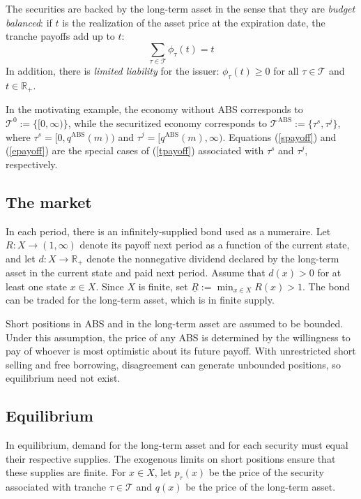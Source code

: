 \documentclass[11pt]{article}
\theoremstyle{plain}
\begin{document}
The securities are backed by the long-term asset in the sense that they are \textit{budget balanced}: if $t$ is the realization of the asset price at the expiration date, the tranche payoffs add up to $t$:
\begin{equation*}
\sum_{\tau\in\mathcal{T}} \phi_\tau(t)=t
\end{equation*}
In addition, there is \textit{limited liability} for the issuer: $\phi_\tau(t) \geq 0$ for all $\tau\in\mathcal{T}$ and $t\in\mathbb{R}_+$.

\newpage
In the motivating example, the economy without ABS corresponds to $\mathcal{T}^0:=\{[0,\infty)\}$, while the securitized economy corresponds to $\mathcal{T}^{\mathrm{ABS}}:=\{\tau^s,\tau^j\}$, where $\tau^s=[0,q^{\mathrm{ABS}}(m))$ and $\tau^j=[q^{\mathrm{ABS}}(m),\infty)$. Equations (\ref{spayoff}) and (\ref{epayoff}) are the special cases of (\ref{tpayoff}) associated with $\tau^s$ and $\tau^j$, respectively.

\subsection{The market}

In each period, there is an infinitely-supplied bond used as a numeraire. Let $R:X\to(1,\infty)$ denote its payoff next period as a function of the current state, and let $d:X\to\mathbb{R}_+$ denote the nonnegative dividend declared by the long-term asset in the current state and paid next period. Assume that $d(x)>0$ for at least one state $x\in X$. Since $X$ is finite, set $\underline R:=\min_{x\in X}R(x)>1$. The bond can be traded for the long-term asset, which is in finite supply.


Short positions in ABS and in the long-term asset are assumed to be bounded. Under this assumption, the price of any ABS is determined by the willingness to pay of whoever is most optimistic about its future payoff. With unrestricted short selling and free borrowing, disagreement can generate unbounded positions, so equilibrium need not exist.


\subsection{Equilibrium} \label{sec:eq}

In equilibrium, demand for the long-term asset and for each security must equal their respective supplies. The exogenous limits on short positions ensure that these supplies are finite.
For $x\in X$, let $p_\tau(x)$ be the price of the security associated with tranche $\tau\in\mathcal{T}$ and $q(x)$ be the price of the long-term asset.
\end{document}

